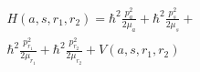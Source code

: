 %
%

\begin{multline}
	H(a, s, r_1, r_2) = \hbar^{2} \frac{p_{a}^2}{2 \mu_{a}} + \hbar^{2} \frac{p_{s}^2}{2 \mu_{s}} + \\
		\hbar^{2} \frac{p_{r_1}^2}{2 \mu_{r_1}} + \hbar^{2} \frac{p_{r_2}^2}{2 \mu_{r_2}} + V(a, s, r_1, r_2)
\label{eq:hamm}
\end{multline}
%
%
